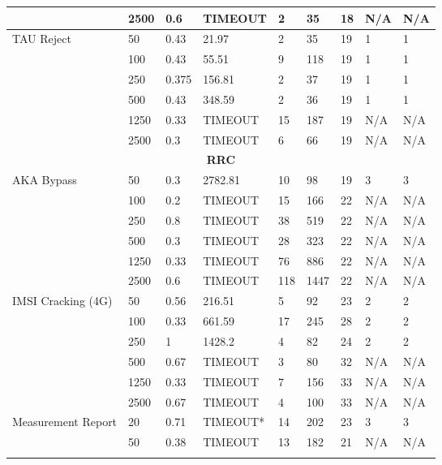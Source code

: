 \begin{table*}[]
{\begin{minipage}{2\columnwidth}
\begin{tabular}{|l|l|l|l|l|l|l|l|l|}
   & 2500 & 0.6 & TIMEOUT & 2 & 35 & 18 & N/A & N/A \\ \hline
  \multirow{6}{*}{TAU Reject} & 50 & 0.43 & 21.97 & 2 & 35 & 19 & 1 & 1 \\ \cline{2-9}
   & 100 & 0.43 & 55.51 & 9 & 118 & 19 & 1 & 1 \\ \cline{2-9}
   & 250 & 0.375 & 156.81 & 2 & 37 & 19 & 1 & 1 \\ \cline{2-9}
   & 500 & 0.43 & 348.59 & 2 & 36 & 19 & 1 & 1 \\ \cline{2-9}
   & 1250 & 0.33 & TIMEOUT & 15 & 187 & 19 & N/A & N/A \\ \cline{2-9}
   & 2500 & 0.3 & TIMEOUT & 6 & 66 & 19 & N/A & N/A \\ \hline
   \multicolumn{9}{|c|}{\textbf{RRC}}                                                                                                                                                                                                                \\ \hline
  \multirow{6}{*}{AKA Bypass} & 50 & 0.3 & 2782.81 & 10 & 98 & 19 & 3 & 3 \\ \cline{2-9}
   & 100 & 0.2 & TIMEOUT & 15 & 166 & 22 & N/A & N/A \\ \cline{2-9}
   & 250 & 0.8 & TIMEOUT & 38 & 519 & 22 & N/A & N/A \\ \cline{2-9}
   & 500 & 0.3 & TIMEOUT & 28 & 323 & 22 & N/A & N/A \\ \cline{2-9}
   & 1250 & 0.33 & TIMEOUT & 76 & 886 & 22 & N/A & N/A \\ \cline{2-9}
   & 2500 & 0.6 & TIMEOUT & 118 & 1447 & 22 & N/A & N/A \\ \hline
  \multirow{6}{*}{IMSI Cracking (4G)} & 50 & 0.56 & 216.51 & 5 & 92 & 23 & 2 & 2 \\ \cline{2-9}
   & 100 & 0.33 & 661.59 & 17 & 245 & 28 & 2 & 2 \\ \cline{2-9}
   & 250 & 1 & 1428.2 & 4 & 82 & 24 & 2 & 2 \\ \cline{2-9}
   & 500 & 0.67 & TIMEOUT & 3 & 80 & 32 & N/A & N/A \\ \cline{2-9}
   & 1250 & 0.33 & TIMEOUT & 7 & 156 & 33 & N/A & N/A \\ \cline{2-9}
   & 2500 & 0.67 & TIMEOUT & 4 & 100 & 33 & N/A & N/A \\ \hline
  \multirow{7}{*}{Measurement Report} & 20 & 0.71 & TIMEOUT* & 14 & 202 & 23 & 3 & 3 \\ \cline{2-9}
   & 50 & 0.38 & TIMEOUT & 13 & 182 & 21 & N/A & N/A \\ \cline{2-9}

\end{tabular}
\end{minipage}}
\end{table*}
